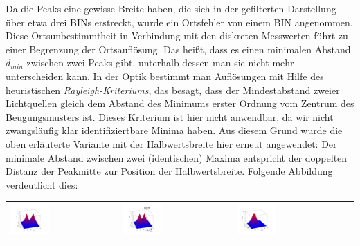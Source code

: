             Da die Peaks eine gewisse Breite haben, die sich in der gefilterten Darstellung über etwa drei BINs erstreckt, wurde ein Ortsfehler von einem BIN angenommen. Diese Ortsunbestimmtheit in Verbindung mit den diskreten Messwerten führt zu einer Begrenzung der Ortsauflösung. Das heißt, dass es einen minimalen Abstand $d_{min}$ zwischen zwei Peaks gibt, unterhalb dessen man sie nicht mehr unterscheiden kann. In der Optik bestimmt man Auflösungen mit Hilfe des heuristischen \textit{Rayleigh-Kriteriums}, das besagt, dass der Mindestabstand zweier Lichtquellen gleich dem Abstand des Minimums erster Ordnung vom Zentrum des Beugungsmusters ist. Dieses Kriterium ist hier nicht anwendbar, da wir nicht zwangsläufig klar identifiziertbare Minima haben. Aus diesem Grund wurde die oben erläuterte Variante mit der Halbwertsbreite hier erneut angewendet: Der minimale Abstand zwischen zwei (identischen) Maxima entspricht der doppelten Distanz der Peakmitte zur Position der Halbwertsbreite. Folgende Abbildung verdeutlicht dies:\\
             
             \begin{tabular}{p{4.5cm}p{4.5cm}p{4.5cm}c}
                                          \includegraphics[width=0.375\textwidth, height=0.2\textheight]{pic/3dplotAufloes3.png}
                                         & 
                                          \includegraphics[width=0.375\textwidth, height=0.2\textheight]{pic/3dplotAufloes2.png}
                                         &
                                          \includegraphics[width=0.375\textwidth, height=0.2\textheight]{pic/3dplotAufloes1.png} \\               
                          
             \end{tabular}
             \label{dfd:Auflösung}
             \vspace{3mm}
             
